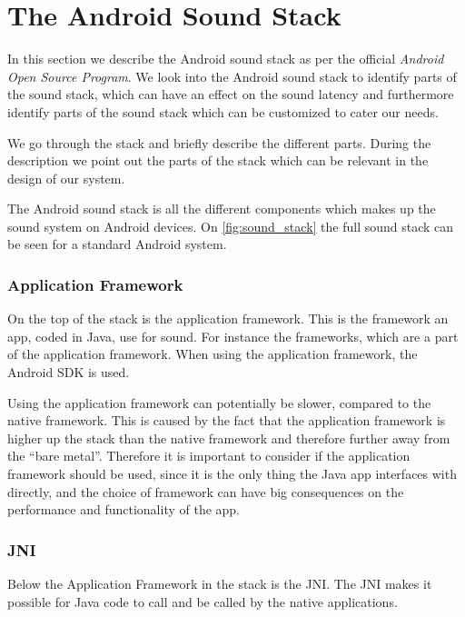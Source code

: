 \section{The Android Sound Stack}\label{sec:androidaudiostack}
In this section we describe the Android sound stack as per the official \textit{Android Open Source Program}\cite{sound_stack}.
We look into the Android sound stack to identify parts of the sound stack,
which can have an effect on the sound latency and furthermore identify parts of the sound stack which can be customized to cater our needs.

We go through the stack and briefly describe the different parts.
During the description we point out the parts of the stack which can be relevant in the design of our system.

The Android sound stack is all the different components which makes up the sound system on Android devices.
On \cref{fig:sound_stack} the full sound stack can be seen for a standard Android system.

\subsubsection*{Application Framework}
On the top of the stack is the application framework.
This is the framework an app, coded in Java, use for sound.
For instance the  frameworks, which are a part of the application framework.
When using the application framework, the Android \ac{SDK} is used.

Using the application framework can potentially be slower, compared to the native framework.
This is caused by the fact that the application framework is higher up the stack than the native framework and therefore further away from the ``bare metal''.
Therefore it is important to consider if the application framework should be used,
since it is the only thing the Java app interfaces with directly,
and the choice of framework can have big consequences on the performance and functionality of the app.

\subsubsection*{JNI}
Below the Application Framework in the stack is the \ac{JNI}.
The \ac{JNI} makes it possible for Java code to call and be called by the native applications\cite{jni}.


